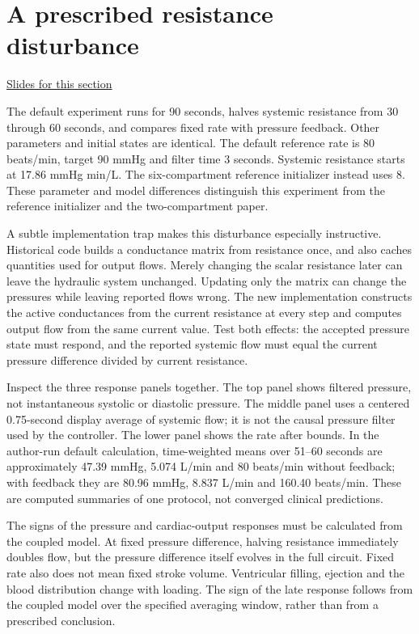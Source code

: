 \documentclass[11pt,letterpaper]{article}
\theoremstyle{definition}\newtheorem{definition}{Definition}\newtheorem{example}{Example}
\numberwithin{equation}{section}
\begin{document}
\section{A prescribed resistance disturbance}
\hypertarget{note-a-prescribed-resistance-disturbance}{}\label{note:a-prescribed-resistance-disturbance}
{\small \href{slides.html\#frame=a-resistance-disturbance-panel-1\&step=1}{Slides for this section}}\par
The default experiment runs for 90 seconds, halves systemic resistance from 30 through 60 seconds, and compares fixed rate with pressure feedback. Other parameters and initial states are identical. The default reference rate is 80 beats/min, target 90 mmHg and filter time 3 seconds. Systemic resistance starts at 17.86 mmHg min/L. The six-compartment reference initializer instead uses 8. These parameter and model differences distinguish this experiment from the reference initializer and the two-compartment paper.

A subtle implementation trap makes this disturbance especially instructive. Historical code builds a conductance matrix from resistance once, and also caches quantities used for output flows. Merely changing the scalar resistance later can leave the hydraulic system unchanged. Updating only the matrix can change the pressures while leaving reported flows wrong. The new implementation constructs the active conductances from the current resistance at every step and computes output flow from the same current value. Test both effects: the accepted pressure state must respond, and the reported systemic flow must equal the current pressure difference divided by current resistance.

Inspect the three response panels together. The top panel shows filtered pressure, not instantaneous systolic or diastolic pressure. The middle panel uses a centered 0.75-second display average of systemic flow; it is not the causal pressure filter used by the controller. The lower panel shows the rate after bounds. In the author-run default calculation, time-weighted means over 51--60 seconds are approximately 47.39 mmHg, 5.074 L/min and 80 beats/min without feedback; with feedback they are 80.96 mmHg, 8.837 L/min and 160.40 beats/min. These are computed summaries of one protocol, not converged clinical predictions.

The signs of the pressure and cardiac-output responses must be calculated from the coupled model. At fixed pressure difference, halving resistance immediately doubles flow, but the pressure difference itself evolves in the full circuit. Fixed rate also does not mean fixed stroke volume. Ventricular filling, ejection and the blood distribution change with loading. The sign of the late response follows from the coupled model over the specified averaging window, rather than from a prescribed conclusion.
\end{document}
